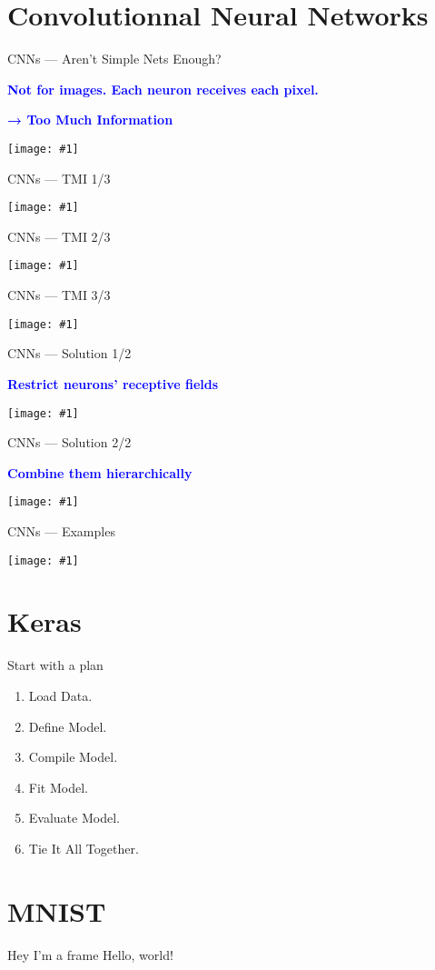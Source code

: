 \documentclass{beamer}
\newcommand\blue[1]{\textcolor{blue}{#1}}
\newcommand\cimg[1]{\vfill\centerline{\texttt{[image: \#1]}}\vfill}
\newcommand\cimgg[1]{\vfill\centerline{\texttt{[image: \#1]}}\vfill}
\newcommand\cimggg[1]{\vfill\centerline{\texttt{[image: \#1]}}\vfill}
\newcommand\vphrase[1]{\vfill\centerline{\large\bf\blue{#1}}\vfill}
\begin{document}
\section{Convolutionnal Neural Networks}
\label{sec:convnets}
\begin{frame}{CNNs --- Aren't Simple Nets Enough?}
  \vphrase{Not for images. Each neuron receives each pixel.}
  \vphrase{→ Too Much Information}
  \vfill
  \cimgg{tmi.jpg}
  \vfill
\end{frame}
\begin{frame}{CNNs --- TMI 1/3}
  \cimgg{park.jpg}
\end{frame}
\begin{frame}{CNNs --- TMI 2/3}
  \cimgg{station.jpg}
\end{frame}
\begin{frame}{CNNs --- TMI 3/3}
  \cimgg{street.jpg}
\end{frame}
\begin{frame}{CNNs --- Solution 1/2}
  \vphrase{Restrict neurons' receptive fields}
  \cimggg{kernel.jpg}
\end{frame}
\begin{frame}{CNNs --- Solution 2/2}
  \vphrase{Combine them hierarchically}
  \cimggg{cnn.jpg}
\end{frame}
\begin{frame}{CNNs --- Examples}
  \cimg{hierarchical-features.png}
\end{frame}

\section{Keras}
\label{sec:keras}
\begin{frame}{Start with a plan}
\begin{enumerate}
\item Load Data.
\item Define Model.
\item Compile Model.
\item Fit Model.
\item Evaluate Model.
\item Tie It All Together.
\end{enumerate}
\end{frame}

\section{MNIST}
\label{sec:mnist}
\begin{frame}{Hey I'm a frame}
  Hello, world!
\end{frame}
\end{document}
